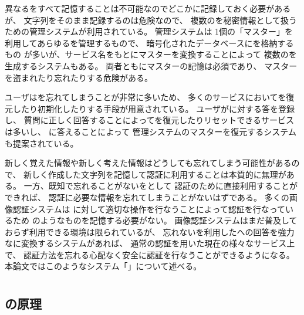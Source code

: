\documentclass[twoside]{wiss}
\begin{document}
異なる{\PW}をすべて記憶することは不可能なのでどこかに記録しておく必要があるが、
{\PW}文字列をそのまま記録するのは危険なので、
複数の{\PW}を秘密情報として扱うための{\PW}管理システムが利用されている。
{\PW}管理システムは
1個の「マスター{\PW}」を利用してあらゆる{\PW}を管理するもので、
暗号化されたデータベースに{\PW}を格納するもの%
\cite{OnePassword}%
\cite{Dashlane}%
\cite{ミルパス}%
\cite{LastPass}%
\cite{KeyPass}%
\cite{NortonIDSafe}%
\cite{IDManager}%
が多いが、サービス名をもとにマスター{\PW}を変換することによって
複数の{\PW}を生成するシステム\cite{SuperGenPass}もある。
両者ともにマスター{\PW}の記憶は必須であり、
マスター{\PW}を盗まれたり忘れたりする危険がある。

ユーザは{\PW}を忘れてしまうことが非常に多いため、
多くのサービスにおいて{\PW}を復元したり初期化したりする手段が用意されている。
ユーザが{\SQ}に対する答を登録し、
質問に正しく回答することによって{\PW}を復元したりリセットできるサービスは多いし、
{\SQ}に答えることによって
{\PW}管理システムのマスター{\PW}を復元するシステム\cite{平野亮:2011-11-07}も提案されている。

新しく覚えた情報や新しく考えた情報はどうしても忘れてしまう可能性があるので、
新しく作成した{\PW}文字列を記憶して認証に利用することは本質的に無理がある。
一方、既知で忘れることがない{\EM}を{\SQ}として
認証のために直接利用することができれば、
認証に必要な情報を忘れてしまうことがないはずである。
多くの画像認証システム\cite{Biddle:2012:GPL:2333112.2333114}\cite{小池英樹:2006-05-15}\cite{GraphicalPasswords}は
{\SQ}に対して適切な操作を行なうことによって認証を行なっているため
{\PW}のようなものを記憶する必要がない。
%
画像認証システムはまだ普及しておらず利用できる環境は限られているが、
忘れない{\EM}を利用した{\SQ}への回答を強力な{\PW}に変換するシステムがあれば、
通常の{\PW}認証を用いた現在の様々なサービス上で、
認証方法を忘れる心配なく安全に認証を行なうことができるようになる。
本論文ではこのようなシステム「{\EP}」について述べる。

\section{{\EP}}

\subsection{{\EP}の原理}
\end{document}
